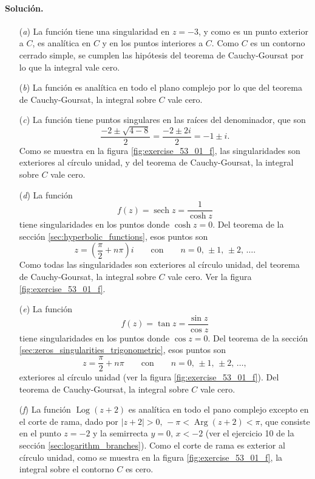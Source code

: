 \documentclass[a4paper]{report}
\DeclareMathOperator{\Arg}{Arg}
\DeclareMathOperator{\Log}{Log}
\DeclareMathOperator{\sech}{sech}
\begin{document}
\paragraph{Solución.} 
\begin{enumerate}
 \item[(\textit{a})] La función tiene una singularidad en \(z=-3\), y como es un punto exterior a \(C\), es analítica en \(C\) y en los puntos interiores a \(C\). Como \(C\) es un contorno cerrado simple, se cumplen las hipótesis del teorema de Cauchy-Goursat por lo que la integral vale cero.
 \item[(\textit{b})] La función es analítica en todo el plano complejo por lo que del teorema de Cauchy-Goursat, la integral sobre \(C\) vale cero.
 \item[(\textit{c})] La función tiene puntos singulares en las raíces del denominador, que son
 \[
  \frac{-2\pm\sqrt{4-8}}{2}=\frac{-2\pm2i}{2}=-1\pm i.
 \]
 Como se muestra en la figura \ref{fig:exercise_53_01_f}, las singularidades son exteriores al círculo unidad, y del teorema de Cauchy-Goursat, la integral sobre \(C\) vale cero.
 \item[(\textit{d})] La función
 \[
  f(z)=\sech z=\frac{1}{\cosh z}
 \]
 tiene singularidades en los puntos donde \(\cosh z=0\). Del teorema de la sección \ref{sec:hyperbolic_functions}, esos puntos son
 \[
  z=\left(\frac{\pi}{2}+n\pi\right)i
  \qquad\textrm{con}\qquad 
  n=0,\,\pm1,\,\pm2,\,\dots.
 \]
 Como todas las singularidades son exteriores al círculo unidad, del teorema de Cauchy-Goursat, la integral sobre \(C\) vale cero. Ver la figura \ref{fig:exercise_53_01_f}.
 \item[(\textit{e})] La función
 \[
  f(z)=\tan z=\frac{\sin z}{\cos z}
 \]
 tiene singularidades en los puntos donde \(\cos z=0\). Del teorema de la sección  \ref{sec:zeros_singularities_trigonometric}, esos puntos son
 \[
  z=\frac{\pi}{2}+n\pi
  \qquad\textrm{con}\qquad 
  n=0,\,\pm1,\,\pm2,\,\dots,
 \]
 exteriores al círculo unidad (ver la figura \ref{fig:exercise_53_01_f}). Del teorema de Cauchy-Goursat, la integral sobre \(C\) vale cero.
 \item[(\textit{f})] La función \(\Log(z+2)\) es analítica en todo el pano complejo excepto en el corte de rama, dado por \(|z+2|>0,\,-\pi<\Arg(z+2)<\pi\), que consiste en el punto \(z=-2\) y la semirrecta \(y=0,\,x<-2\) (ver el ejercicio 10 de la sección \ref{sec:logarithm_branches}). Como el corte de rama es exterior al círculo unidad, como se muestra en la figura \ref{fig:exercise_53_01_f}, la integral sobre el contorno \(C\) es cero.
\end{enumerate}
\end{document}
